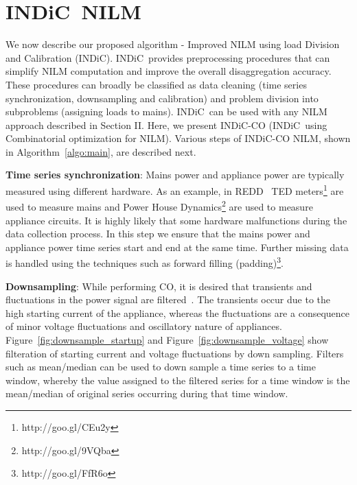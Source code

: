 \documentclass[conference]{IEEEtran}
\newcommand{\figref}[1]{Figure~\ref{#1}}
\newcommand{\algoref}[1]{Algorithm~\ref{#1}}
\newcommand{\indic}{INDiC~}
\newcommand{\indicns}{INDiC}
\begin{document}
\vspace{-2mm}
\section{\indic NILM}
\vspace{-1mm}
\noindent We now describe our proposed algorithm - Improved NILM using load Division and Calibration (\indicns). \indic provides preprocessing procedures that can simplify NILM computation and improve the overall disaggregation accuracy. These procedures can broadly be classified as data cleaning (time series synchronization, downsampling and calibration) and problem division into subproblems (assigning loads to mains). \indic can be used with any NILM approach described in Section II. Here, we present \indicns-CO (\indic using Combinatorial optimization for NILM). %
Various steps of \indicns-CO NILM, shown in \algoref{algo:main}, are described next. 

\noindent\textbf{Time series synchronization}: Mains power and appliance power are typically measured using different hardware. As an example, in REDD~\cite{redd} TED meters\footnote{http://goo.gl/CEu2y} are used to measure mains and Power House Dynamics\footnote{http://goo.gl/9VQba} are used to measure appliance circuits. It is highly likely that some hardware malfunctions during the data collection process. In this step we ensure that the mains power and appliance power time series start and end at the same time. Further missing data is handled using the techniques such as forward filling (padding)\footnote{http://goo.gl/FfR6o}.

\noindent\textbf{Downsampling}: While performing CO, it is desired that transients and fluctuations in the power signal are filtered~\cite{hart}. The transients occur due to the high starting current of the appliance, whereas the fluctuations are a consequence of minor voltage fluctuations and oscillatory nature of appliances. \figref{fig:downsample_startup} and \figref{fig:downsample_voltage} show filteration of starting current and voltage fluctuations by down sampling. Filters such as mean/median can be used to down sample a time series to a time window, whereby the value assigned to the filtered series for a time window is the mean/median of original series occurring during that time window. 
\end{document}
